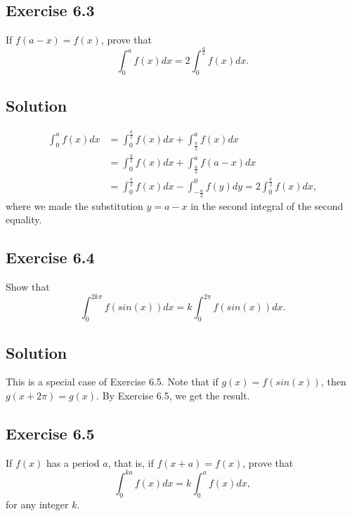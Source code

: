 \subsection*{Exercise 6.3}

If $f(a - x) = f(x)$, prove that
\begin{equation*}
    \int_0^a f(x) dx = 2 \int_0^{\frac{a}{2}} f(x) dx.
\end{equation*}

\subsection*{Solution}

\begin{equation*}
    \begin{split}
        \int_0^a f(x) dx
            &= \int_0^{\frac{a}{2}} f(x) dx + \int_{\frac{a}{2}}^a f(x) dx \\
            &= \int_0^{\frac{a}{2}} f(x) dx + \int_{\frac{a}{2}}^a f(a - x) dx \\
            &= \int_0^{\frac{a}{2}} f(x) dx - \int_{-\frac{a}{2}}^{0} f(y) dy
            = 2 \int_0^{\frac{a}{2}} f(x) dx,
    \end{split}
\end{equation*}
where we made the substitution $y = a - x$ in the second integral of the second equality.


\subsection*{Exercise 6.4}

Show that
\begin{equation*}
    \int_0^{2k\pi} f(sin(x)) dx = k \int_0^{2\pi} f(sin(x)) dx.
\end{equation*}

\subsection*{Solution}

This is a special case of Exercise 6.5.
Note that if $g(x) = f(sin(x))$, then $g(x + 2\pi) = g(x)$.
By Exercise 6.5, we get the result.


\subsection*{Exercise 6.5}

If $f(x)$ has a period $a$, that is, if $f(x + a) = f(x)$, prove that
\begin{equation*}
    \int_0^{ka} f(x) dx = k \int_0^a f(x) dx,
\end{equation*}
for any integer $k$.

